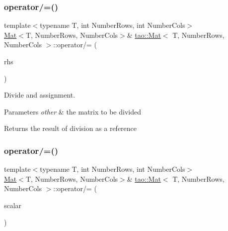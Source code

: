 \subsubsection{\texorpdfstring{operator/=()}{operator/=()}\hspace{0.1cm}{\footnotesize\ttfamily [1/2]}}
{\footnotesize\ttfamily template$<$typename T, int Number\+Rows, int Number\+Cols$>$ \\
\mbox{\hyperlink{classtao_1_1_mat}{Mat}}$<$T, Number\+Rows, Number\+Cols$>$\& \mbox{\hyperlink{classtao_1_1_mat}{tao\+::\+Mat}}$<$ T, Number\+Rows, Number\+Cols $>$\+::operator/= (\begin{DoxyParamCaption}\item[{const \mbox{\hyperlink{classtao_1_1_mat}{Mat}}$<$ T, Number\+Rows, Number\+Cols $>$ \&}]{rhs }\end{DoxyParamCaption})\hspace{0.3cm}{\ttfamily [inline]}}



Divide and assignment. 


\begin{DoxyParams}{Parameters}
{\em other} & the matrix to be divided \\
\hline
\end{DoxyParams}
\begin{DoxyReturn}{Returns}
the result of division as a reference 
\end{DoxyReturn}
\mbox{\label{classtao_1_1_mat_aaf383a5fdb98d14de8beca8da5415175}} 
\subsubsection{\texorpdfstring{operator/=()}{operator/=()}\hspace{0.1cm}{\footnotesize\ttfamily [2/2]}}
{\footnotesize\ttfamily template$<$typename T, int Number\+Rows, int Number\+Cols$>$ \\
\mbox{\hyperlink{classtao_1_1_mat}{Mat}}$<$T, Number\+Rows, Number\+Cols$>$\& \mbox{\hyperlink{classtao_1_1_mat}{tao\+::\+Mat}}$<$ T, Number\+Rows, Number\+Cols $>$\+::operator/= (\begin{DoxyParamCaption}\item[{const T}]{scalar }\end{DoxyParamCaption})\hspace{0.3cm}{\ttfamily [inline]}}



